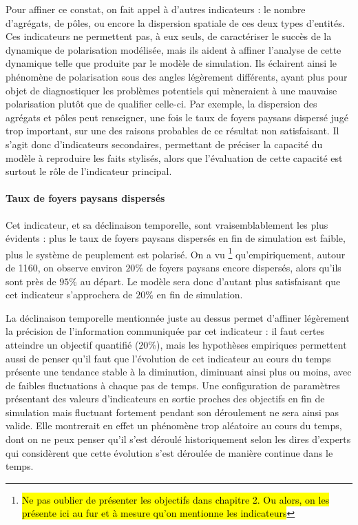 \documentclass[12pt, a4paper, oneside]{book}
\begin{document}
	Pour affiner ce constat, on fait appel à d'autres indicateurs : le nombre d'agrégats, de pôles, ou encore la dispersion spatiale de ces deux types d'entités.
	Ces indicateurs ne permettent pas, à eux seuls, de caractériser le succès de la dynamique de polarisation modélisée, mais ils aident à affiner l'analyse de cette dynamique telle que produite par le modèle de simulation.
	Ils éclairent ainsi le phénomène de polarisation sous des angles légèrement différents, ayant plus pour objet de diagnostiquer les problèmes potentiels qui mèneraient à une mauvaise polarisation plutôt que de qualifier celle-ci.
	Par exemple, la dispersion des agrégats et pôles peut renseigner, une fois le taux de foyers paysans dispersé jugé trop important, sur une des raisons probables de ce résultat non satisfaisant.
	Il s'agit donc d'indicateurs secondaires, permettant de préciser la capacité du modèle à reproduire les faits stylisés, alors que l'évaluation de cette capacité est surtout le rôle de l'indicateur principal.
	
	\paragraph{Taux de foyers paysans dispersés}
	
	Cet indicateur, et sa déclinaison temporelle, sont vraisemblablement les plus évidents : plus le taux de foyers paysans dispersés en fin de simulation est faible, plus le système de peuplement est polarisé. On a vu \footnote{\hl{Ne pas oublier de présenter les objectifs dans chapitre 2. Ou alors, on les présente ici au fur et à mesure qu'on mentionne les indicateurs}} qu'empiriquement, autour de 1160, on observe environ $20\%$ de foyers paysans encore dispersés, alors qu'ils sont près de $95\%$ au départ.
	Le modèle sera donc d'autant plus satisfaisant que cet indicateur s'approchera de $20\%$ en fin de simulation.
	
	La \og déclinaison temporelle\fg{} mentionnée juste au dessus permet d'affiner légèrement la précision de l'information communiquée par cet indicateur : il faut certes atteindre un objectif quantifié ($20\%$), mais les hypothèses empiriques permettent aussi de penser qu'il faut que l'évolution de cet indicateur au cours du temps présente une tendance stable à la diminution, diminuant ainsi plus ou moins, avec de faibles fluctuations à chaque pas de temps.
	Une configuration de paramètres présentant des valeurs d'indicateurs en sortie proches des objectifs en fin de simulation mais fluctuant fortement pendant son déroulement ne sera ainsi pas valide. Elle montrerait en effet  un phénomène trop aléatoire au cours du temps, dont on ne peux penser qu'il s'est déroulé historiquement selon les dires d'experts qui considèrent que cette évolution s'est déroulée de manière continue dans le temps.
	
\end{document}
